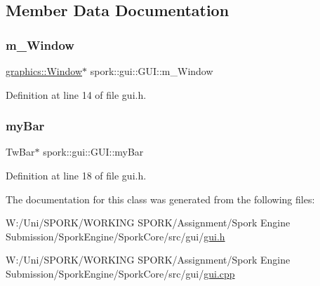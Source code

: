 \subsection{Member Data Documentation}
\mbox{\label{classspork_1_1gui_1_1_g_u_i_ac865a577121a3a5ca2319ef638484956}} 
\subsubsection{\texorpdfstring{m\+\_\+\+Window}{m\_Window}}
{\footnotesize\ttfamily \hyperlink{classspork_1_1graphics_1_1_window}{graphics\+::\+Window}$\ast$ spork\+::gui\+::\+G\+U\+I\+::m\+\_\+\+Window\hspace{0.3cm}{\ttfamily [private]}}



Definition at line 14 of file gui.\+h.

\mbox{\label{classspork_1_1gui_1_1_g_u_i_a3eb1c6aa668d31183967e050bc7bafd0}} 
\subsubsection{\texorpdfstring{my\+Bar}{myBar}}
{\footnotesize\ttfamily Tw\+Bar$\ast$ spork\+::gui\+::\+G\+U\+I\+::my\+Bar}



Definition at line 18 of file gui.\+h.



The documentation for this class was generated from the following files\+:\begin{DoxyCompactItemize}
\item 
W\+:/\+Uni/\+S\+P\+O\+R\+K/\+W\+O\+R\+K\+I\+N\+G S\+P\+O\+R\+K/\+Assignment/\+Spork Engine Submission/\+Spork\+Engine/\+Spork\+Core/src/gui/\hyperlink{gui_8h}{gui.\+h}\item 
W\+:/\+Uni/\+S\+P\+O\+R\+K/\+W\+O\+R\+K\+I\+N\+G S\+P\+O\+R\+K/\+Assignment/\+Spork Engine Submission/\+Spork\+Engine/\+Spork\+Core/src/gui/\hyperlink{gui_8cpp}{gui.\+cpp}\end{DoxyCompactItemize}

